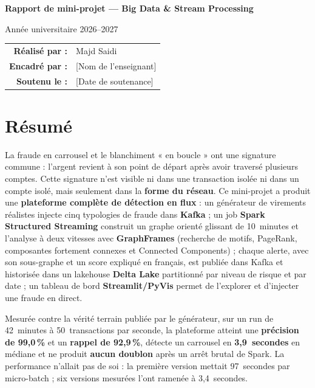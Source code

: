 \documentclass[11pt,a4paper]{report}
\newcommand{\etudiant}{Majd Saidi}
\newcommand{\enseignant}{[Nom de l'enseignant]}
\newcommand{\datesoutenance}{[Date de soutenance]}
\newcommand{\anneeuniv}{2026--2027}
\begin{document}
\begin{titlepage}
\begin{center}
  {\large\bfseries Rapport de mini-projet --- Big Data \& Stream Processing\par}
  \vspace{2mm}
  {\color{encre2}Année universitaire \anneeuniv\par}
\end{center}
\vfill
\begin{center}
\begin{tabular}{rl}
  \textbf{Réalisé par :} & \etudiant\\[2mm]
  \textbf{Encadré par :} & \enseignant\\[2mm]
  \textbf{Soutenu le :} & \datesoutenance\\
\end{tabular}
\end{center}
\vspace{5mm}
\end{titlepage}


\chapter*{Résumé}

La fraude en carrousel et le blanchiment « en boucle » ont une signature commune :
l'argent revient à son point de départ après avoir traversé plusieurs comptes.
Cette signature n'est visible ni dans une transaction isolée ni dans un compte
isolé, mais seulement dans la \textbf{forme du réseau}. Ce mini-projet a produit
une \textbf{plateforme complète de détection en flux} : un générateur de virements
réalistes injecte cinq typologies de fraude dans \textbf{Kafka} ; un job
\textbf{Spark Structured Streaming} construit un graphe orienté glissant de
10~minutes et l'analyse à deux vitesses avec \textbf{GraphFrames} (recherche de
motifs, PageRank, composantes fortement connexes et Connected Components) ;
chaque alerte, avec son sous-graphe et un score expliqué en français, est publiée
dans Kafka et historisée dans un lakehouse \textbf{Delta Lake} partitionné par
niveau de risque et par date ; un tableau de bord \textbf{Streamlit/PyVis} permet
de l'explorer et d'injecter une fraude en direct.

Mesurée contre la vérité terrain publiée par le générateur, sur un run de
42~minutes à 50~transactions par seconde, la plateforme atteint une
\textbf{précision de 99,0\,\%} et un \textbf{rappel de 92,9\,\%}, détecte un
carrousel en \textbf{3,9~secondes} en médiane et ne produit \textbf{aucun doublon}
après un arrêt brutal de Spark. La performance n'allait pas de soi : la première
version mettait 97~secondes par micro-batch ; six versions mesurées l'ont ramenée
à 3,4~secondes.
\end{document}
